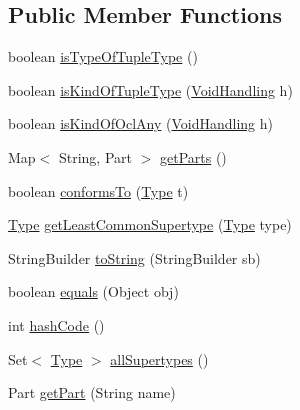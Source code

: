 \subsection*{Public Member Functions}
\begin{DoxyCompactItemize}
\item 
boolean \hyperlink{classorg_1_1tzi_1_1use_1_1uml_1_1ocl_1_1type_1_1_tuple_type_a09e39b0e38e9cd2361a1d7e99d3dfa1c}{is\-Type\-Of\-Tuple\-Type} ()
\item 
boolean \hyperlink{classorg_1_1tzi_1_1use_1_1uml_1_1ocl_1_1type_1_1_tuple_type_a498f7179915394f8f756ac56ea1b6637}{is\-Kind\-Of\-Tuple\-Type} (\hyperlink{enumorg_1_1tzi_1_1use_1_1uml_1_1ocl_1_1type_1_1_type_1_1_void_handling}{Void\-Handling} h)
\item 
boolean \hyperlink{classorg_1_1tzi_1_1use_1_1uml_1_1ocl_1_1type_1_1_tuple_type_a858b05b0d5e6179ce397a29d46c92f3b}{is\-Kind\-Of\-Ocl\-Any} (\hyperlink{enumorg_1_1tzi_1_1use_1_1uml_1_1ocl_1_1type_1_1_type_1_1_void_handling}{Void\-Handling} h)
\item 
Map$<$ String, Part $>$ \hyperlink{classorg_1_1tzi_1_1use_1_1uml_1_1ocl_1_1type_1_1_tuple_type_a92cbdbb2b367ea0e1bb5da8f903d2865}{get\-Parts} ()
\item 
boolean \hyperlink{classorg_1_1tzi_1_1use_1_1uml_1_1ocl_1_1type_1_1_tuple_type_a79167c18a382f71d9776ec9dfc656557}{conforms\-To} (\hyperlink{interfaceorg_1_1tzi_1_1use_1_1uml_1_1ocl_1_1type_1_1_type}{Type} t)
\item 
\hyperlink{interfaceorg_1_1tzi_1_1use_1_1uml_1_1ocl_1_1type_1_1_type}{Type} \hyperlink{classorg_1_1tzi_1_1use_1_1uml_1_1ocl_1_1type_1_1_tuple_type_a14f764bdd527395057baf260f96d8f9c}{get\-Least\-Common\-Supertype} (\hyperlink{interfaceorg_1_1tzi_1_1use_1_1uml_1_1ocl_1_1type_1_1_type}{Type} type)
\item 
String\-Builder \hyperlink{classorg_1_1tzi_1_1use_1_1uml_1_1ocl_1_1type_1_1_tuple_type_af54d27176f7a16a2696bfff4d6b60749}{to\-String} (String\-Builder sb)
\item 
boolean \hyperlink{classorg_1_1tzi_1_1use_1_1uml_1_1ocl_1_1type_1_1_tuple_type_a2a3b818079208958e3354c50788b21d6}{equals} (Object obj)
\item 
int \hyperlink{classorg_1_1tzi_1_1use_1_1uml_1_1ocl_1_1type_1_1_tuple_type_a24d13386e3765b027ccf1c1c559eb8ee}{hash\-Code} ()
\item 
Set$<$ \hyperlink{interfaceorg_1_1tzi_1_1use_1_1uml_1_1ocl_1_1type_1_1_type}{Type} $>$ \hyperlink{classorg_1_1tzi_1_1use_1_1uml_1_1ocl_1_1type_1_1_tuple_type_a3fe8f5c3bb691c4869763d32df133985}{all\-Supertypes} ()
\item 
Part \hyperlink{classorg_1_1tzi_1_1use_1_1uml_1_1ocl_1_1type_1_1_tuple_type_ab7e03052bb9c8198f8a6d75641454225}{get\-Part} (String name)
\end{DoxyCompactItemize}


